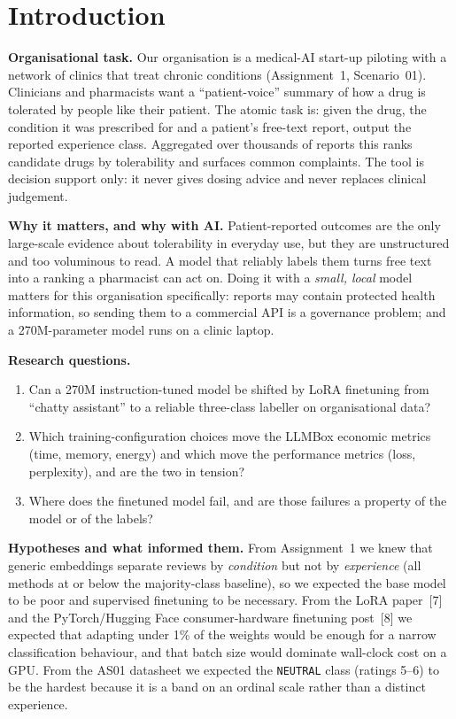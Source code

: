 \documentclass[11pt]{article}
\newcommand{\code}[1]{\texttt{#1}}
\begin{document}
\section{Introduction}
\textbf{Organisational task.} Our organisation is a medical-AI start-up piloting with a network of clinics that treat chronic conditions (Assignment~1, Scenario~01). Clinicians and pharmacists want a ``patient-voice'' summary of how a drug is tolerated by people like their patient. The atomic task is: given the drug, the condition it was prescribed for and a patient's free-text report, output the reported experience class. Aggregated over thousands of reports this ranks candidate drugs by tolerability and surfaces common complaints. The tool is decision support only: it never gives dosing advice and never replaces clinical judgement.

\textbf{Why it matters, and why with AI.} Patient-reported outcomes are the only large-scale evidence about tolerability in everyday use, but they are unstructured and too voluminous to read. A model that reliably labels them turns free text into a ranking a pharmacist can act on. Doing it with a \emph{small, local} model matters for this organisation specifically: reports may contain protected health information, so sending them to a commercial API is a governance problem; and a 270M-parameter model runs on a clinic laptop.

\textbf{Research questions.}
\begin{enumerate}[label=RQ\arabic*.]
\item Can a 270M instruction-tuned model be shifted by LoRA finetuning from ``chatty assistant'' to a reliable three-class labeller on organisational data?
\item Which training-configuration choices move the LLMBox economic metrics (time, memory, energy) and which move the performance metrics (loss, perplexity), and are the two in tension?
\item Where does the finetuned model fail, and are those failures a property of the model or of the labels?
\end{enumerate}

\textbf{Hypotheses and what informed them.} From Assignment~1 we knew that generic embeddings separate reviews by \emph{condition} but not by \emph{experience} (all methods at or below the majority-class baseline), so we expected the base model to be poor and supervised finetuning to be necessary. From the LoRA paper~[7] and the PyTorch/Hugging Face consumer-hardware finetuning post~[8] we expected that adapting under 1\% of the weights would be enough for a narrow classification behaviour, and that batch size would dominate wall-clock cost on a GPU. From the AS01 datasheet we expected the \code{NEUTRAL} class (ratings 5--6) to be the hardest because it is a band on an ordinal scale rather than a distinct experience.
\end{document}
